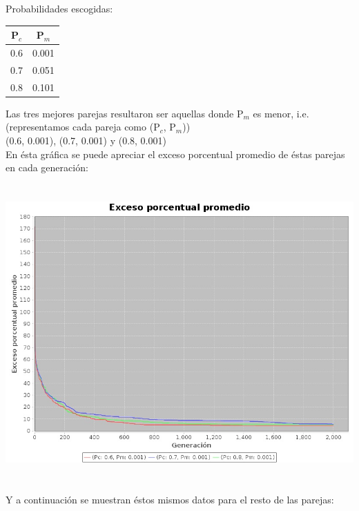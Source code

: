 \documentclass[12pt]{article}
\begin{document}
\noindent Probabilidades escogidas: \\

\begin{center}
    \begin{tabular}{c | c}
      P$_c$ & P$_m$  \\ \hline
      0.6 & 0.001  \\ \hline
      0.7 & 0.051  \\ \hline
      0.8 & 0.101  \\
    \end{tabular}
\end{center}

\noindent Las tres mejores parejas resultaron ser aquellas donde P$_m$ es menor, i.e.
(representamos cada pareja como (P$_c$, P$_m$)) \\
(0.6, 0.001), (0.7, 0.001) y (0.8, 0.001) \\ 

\noindent En ésta gráfica se puede apreciar el exceso porcentual promedio de éstas  parejas
en cada generación: \\ \\ \\

\includegraphics[width=\textwidth]{datos.jpeg} \\ \\ \\

\noindent Y a continuación se muestran éstos mismos datos para el resto de las parejas: \\
\end{document}
